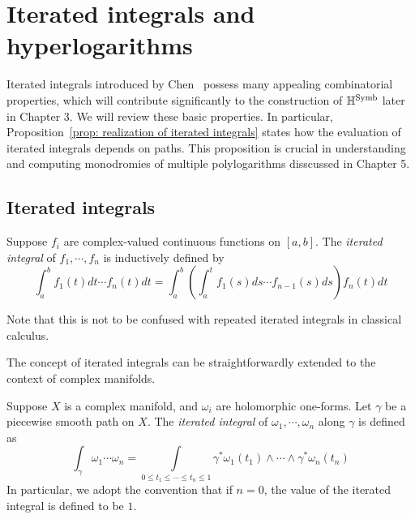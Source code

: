 \section{Iterated integrals and hyperlogarithms}

Iterated integrals introduced by Chen~\cite{Chen_IteratedPathIntegrals} possess many appealing combinatorial properties, which will contribute significantly to the construction of $\mathbb H^{\operatorname{Symb}}$ later in Chapter 3. We will review these basic properties. In particular, Proposition~\ref{prop: realization of iterated integrals} states how the evaluation of iterated integrals depends on paths. This proposition is crucial in understanding and computing monodromies of multiple polylogarithms disscussed in Chapter 5.

\subsection{Iterated integrals}

\begin{definition}
Suppose $f_i$ are complex-valued continuous functions on $[a,b]$. The \textit{iterated integral} of $f_1,\cdots,f_n$ is inductively defined by
\begin{equation}
\int_a^bf_1(t)dt\cdots f_n(t)dt=\int_a^b\left(\int_a^tf_1(s)ds\cdots f_{n-1}(s)ds\right)f_n(t)dt
\end{equation}
\end{definition}

\begin{remark}
Note that this is not to be confused with repeated iterated integrals in classical calculus.
\end{remark}

The concept of iterated integrals can be straightforwardly extended to the context of complex manifolds.

\begin{definition}\label{def: iterated integrals}
Suppose $X$ is a complex manifold, and $\omega_i$ are holomorphic one-forms. Let $\gamma$ be a piecewise smooth path on $X$. The \textit{iterated integral} of $\omega_1,\cdots,\omega_n$ along $\gamma$ is defined as
\begin{equation}\label{eq: iterated integral}
\int_\gamma\omega_1\cdots\omega_n=\int\limits_{0\leq t_1\leq\cdots\leq t_n\leq 1}\gamma^*\omega_1(t_1)\wedge\cdots\wedge\gamma^*\omega_n(t_n)
\end{equation}
In particular, we adopt the convention that if $n=0$, the value of the iterated integral is defined to be $1$.
\end{definition}

